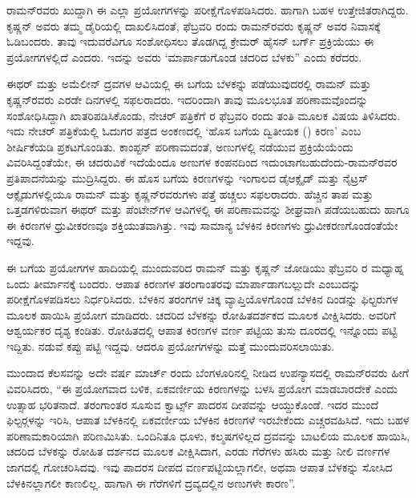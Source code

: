 ರಾಮನ್‍ರವರು ಖುದ್ದಾಗಿ ಈ ಎಲ್ಲಾ ಪ್ರಯೋಗಗಳನ್ನು ಪರೀಕ್ಷೆಗೊಳಪಡಿಸಿದರು. ಹಾಗಾಗಿ ಬಹಳ ಉತ್ತೇಜಿತರಾಗಿದ್ದರು. ಕೃಷ್ಣನ್ ಅವರು ತಮ್ಮ ಡೈರಿಯಲ್ಲಿ ದಾಖಲಿಸಿದಂತೆ, ಫೆಬ್ರವರಿ  ರಂದು ರಾಮನ್‍ರವರು ಕೃಷ್ಣನ್ ಅವರ ನಿವಾಸಕ್ಕೆ ಓಡಿಬಂದರು. ತಾವು ಇದುವರೆವಿಗೂ ಸಂಶೋಧಿಸಲು ತೊಡಗಿದ್ದ ಕ್ರೇಮರ್ ಹೈಸನ್ ಬರ್ಗ್ ಪ್ರಕ್ರಿಯೆಯು ಈ ಪ್ರಯೋಗಗಳಲ್ಲಿದೆ ಎಂದರು. ಇದನ್ನು ಅವರು ‘ಮಾರ್ಪಾಡುಗೊಂಡ ಚದರಿದ ಬೆಳಕು” ಎಂದು ಕರೆದರು.

ಈಥರ್ ಮತ್ತು ಅಮೆಲೀನ್ ದ್ರವಗಳ ಆವಿಯಲ್ಲಿ ಈ ಬಗೆಯ ಬೆಳಕನ್ನು ಪಡೆಯುವುದರಲ್ಲಿ ರಾಮನ್ ಮತ್ತು ಕೃಷ್ಣನ್‍ರವರು ಎರಡೇ ದಿನಗಳಲ್ಲಿ ಸಫಲರಾದರು. ಇದರಿಂದಾಗಿ ತಾವು ಮೂಲಭೂತ ಪರಿಣಾಮವೊಂದನ್ನು ಸಂಶೋಧಿಸಿದ್ದಾಗಿ ಖಾತರಿಪಡಿಸಿಕೊಂಡು, ನೇಚರ್ ಪತ್ರಿಕೆಗೆ ರ ಫೆಬ್ರವರಿ ರಂದು ತಂತಿ ಮೂಲಕ ವಿಷಯ ತಿಳಿಸಿದರು. ಇದು ನೇಚರ್ ಪತ್ರಿಕೆಯಲ್ಲಿ ಓದುಗರ ಪತ್ರದ ಅಂಕಣದಲ್ಲಿ ‘ಹೊಸ ಬಗೆಯ ದ್ವಿತೀಯಕ () ಕಿರಣ’ ಎಂಬ ಶೀರ್ಷಿಕೆಯಡಿ ಪ್ರಕಟಗೊಂಡಿತು. ಕಾಂಪ್ಟನ್ ಪರಿಣಾಮದಂತೆ, ಅಣುಗಳಲ್ಲಿ ನಡೆಯುವ ಪ್ರಕ್ರಿಯೆಯೆಂದು ವಿವರಿಸಿದ್ದಂತೆಯೇ, ಈ ಚದರುವಿಕೆ ಇದೆಯೆಂದೂ ಅಣುಗಳ ಕಂಪನದಿಂದ ಇದುಂಟಾಗಬಹುದೆಂದು-ರಾಮನ್‍ರವರ ಪ್ರತಿಪಾದನೆಯನ್ನು ಮುದ್ರಿಸಿದ್ದರು. ಈ ಹೊಸ ಬಗೆಯ ಕಿರಣಗಳನ್ನು ಇಂಗಾಲದ ಡೈಆಕ್ಸೈಡ್ ಮತ್ತು ನೈಟ್ರಸ್ ಆಕ್ಸೈಡುಗಳಲ್ಲಿಯೂ ರಾಮನ್ ಮತ್ತು ಕೃಷ್ಣನ್‍ರವರುಗಳು ಪತ್ತೆ ಹಚ್ಚಲು ಸಫಲರಾದರು. ಹೆಚ್ಚಿನ ತಾಪ ಮತ್ತು ಒತ್ತಡಗಳಿರುವಾಗ ಈಥರ್ ಮತ್ತು ಪೆಂಟೇನ್‍ಗಳ ಆವಿಗಳಲ್ಲಿ ಈ ಪರಿಣಾಮವನ್ನು ಶೀಘ್ರವಾಗಿ ಪಡೆಯಬಹುದು ಹಾಗೂ ಈ ಕಿರಣಗಳ ಧ್ರುವೀಕರಣವೂ ಶಕ್ತಿಯುತವಾಗಿತ್ತು. ಇವು ಸಾಮಾನ್ಯ ಬೆಳಕಿನ ಕಿರಣಗಳು ಧ್ರುವೀಕರಣಗೊಂಡಂತೆಯೇ ಇದ್ದವು.

ಈ ಬಗೆಯ ಪ್ರಯೋಗಗಳ ಹಾದಿಯಲ್ಲಿ ಮುಂದುವರಿದ ರಾಮನ್ ಮತ್ತು ಕೃಷ್ಣನ್ ಜೋಡಿಯು  ಫೆಬ್ರವರಿ ರ ಮಧ್ಯಾಹ್ನ ಒಂದು ತೀರ್ಮಾನಕ್ಕೆ ಬಂದರು. ಆಪಾತ ಕಿರಣಗಳ ತರಂಗಾಂತರವು ಮಾರ್ಪಾಡಾಗಬಲ್ಲುದೇ ಎಂಬುದನ್ನು ಪರೀಕ್ಷೆಗೊಳಪಡಿಸಲು ನಿರ್ಧರಿಸಿದರು. ಬೆಳಕಿನ ತರಂಗಗಳ ಚಿಕ್ಕ ವ್ಯಾಪ್ತಿಯೊಳಗೊಂಡ ಬೆಳಕಿನ ದಿಂಡನ್ನು ಫಿಲ್ಟರುಗಳ ಮೂಲಕ ಹಾಯಿಸಿ ಪ್ರಯೋಗ ಮಾಡಿದರು. ಚದರಿದ ಬೆಳಕನ್ನು ರೋಹಿತದರ್ಶಕದ ಮೂಲಕ ವೀಕ್ಷಿಸಿದರು. ಅವರಿಗೆ ಆಶ್ವರ್ಯಕರ ದೃಶ್ಯ ಕಂಡಿತು. ರೋಹಿತದಲ್ಲಿ ಆಪಾತ ಕಿರಣಗಳ ವರ್ಣ ಪಟ್ಟಿಯ ತುಸು ದೂರದಲ್ಲಿ ಇನ್ನೊಂದು ಪಟ್ಟಿ ಇದ್ದಿತು. ನಡುವೆ ಕಪ್ಪು ಪಟ್ಟಿ ಇದ್ದವು. ಆದರೂ ಪ್ರಯೋಗಗಳನ್ನು ಮತ್ತೆ ಮುಂದುವರಿಸಲಾಯಿತು.

ಮುಂದಾದ ಕೆಲಸವನ್ನು ಅದೇ ವರ್ಷ ಮಾರ್ಚ್  ರಂದು ಬೆಂಗಳೂರಿನಲ್ಲಿ ನೀಡಿದ ಉಪನ್ಯಾಸದಲ್ಲಿ ರಾಮನ್‍ರವರು ಹೀಗೆ ವಿವರಿಸಿದರು, “ಈ ಪ್ರಯೋಗವಾದ ಬಳಿಕ, ಏಕವರ್ಣೀಯ ಕಿರಣಗಳನ್ನು ಬಳಸಿ ಪ್ರಯೋಗ ಮಾಡಬಾರದೇಕೆ ಎಂದು ಉತ್ಸಾಹ ಭರಿತನಾದೆ.  ತರಂಗಾಂತರ ಸೂಸುವ ಕ್ವಾರ್ಟ್ಸ್ ಪಾದರಸ ದೀಪವನ್ನು ಆಯ್ದುಕೊಂಡೆ. ಇದರ ಮುಂದೆ ಫಿಲ್ಟರ್‍ಗಳನ್ನು ಇರಿಸಿ, ಆಪಾತ ಬೆಳಕಿನಲ್ಲಿ ಏಕವರ್ಣೀಯ ಬೆಳಕಿನ ಕಿರಣಗಳೆ ಇರಬೇಕೆಂದು ಎಚ್ಚರವಹಿಸಿದೆ. ಇದು ಬಹಳ ಪರಿಣಾಮಕಾರಿಯಾಗಿ ಪರಿಣಮಿಸಿತು. ಒಂದಿನಿತೂ ಧೂಳು, ಕಲ್ಮಷಗಳಿಲ್ಲದ ದ್ರವವನ್ನು ಬಾಟಲಿಯ ಮೂಲಕ ಹಾಯಿಸಿ, ಚದರಿದ ಬೆಳಕನ್ನು ರೋಹಿತ ದರ್ಶನದ ಮೂಲಕ ವೀಕ್ಷಿಸಿದಾಗ, ಎರಡು ಗೆರೆಗಳು ಹಸಿರು ಮತ್ತು ನೀಲಿ ವರ್ಣಗಳ ಜಾಗದಲ್ಲಿ ಗೋಚರಿಸಿದವು. ಇವು ಪಾದರಸ ದೀಪದ ವರ್ಣಪಟ್ಟಿಯಲ್ಲಾಗಲೀ, ಅಥವಾ ಆಪಾತ ಬೆಳಕನ್ನು ಸೋಸಿದ ಬೆಳಕಿನಲ್ಲಾಗಲೀ ಕಾಣಲಿಲ್ಲ. ಹಾಗಾಗಿ ಈ ಗೆರೆಗಳಿಗೆ ದ್ರವ್ಯದಲ್ಲಿನ ಅಣುಗಳೇ ಕಾರಣ”.

